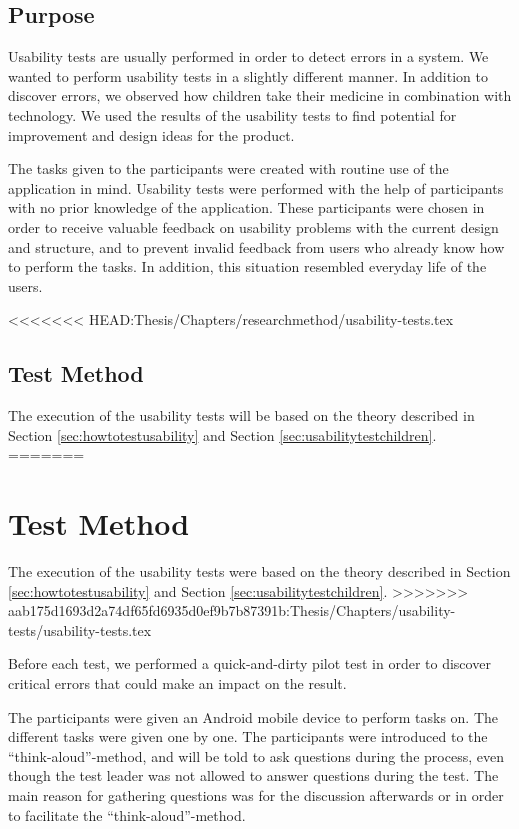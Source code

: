 
\subsection{Purpose}
\label{sec:usabilitypurpose}
Usability tests are usually performed in order to detect errors in a system. We wanted to perform usability tests in a slightly different manner. In addition to discover errors, we observed how children take their medicine in combination with technology. We used the results of the usability tests to find potential for improvement and design ideas for  the product.
 
The tasks given to the participants were created with routine use of the application in mind. Usability tests were performed with the help of participants with no prior knowledge of the application. These participants were chosen in order to receive valuable feedback on usability problems with the current design and structure, and to prevent invalid feedback from users who already know how to perform the tasks. In addition, this situation resembled everyday life of the users.


<<<<<<< HEAD:Thesis/Chapters/researchmethod/usability-tests.tex
\subsection{Test Method}
The execution of the usability tests will be based on the theory described in Section \ref{sec:howtotestusability} and Section \ref{sec:usabilitytestchildren}.
=======
\section{Test Method}
The execution of the usability tests were based on the theory described in Section \ref{sec:howtotestusability} and Section \ref{sec:usabilitytestchildren}.
>>>>>>> aab175d1693d2a74df65fd6935d0ef9b7b87391b:Thesis/Chapters/usability-tests/usability-tests.tex

Before each test, we performed a quick-and-dirty pilot test in order to discover critical errors that could make an impact on the result.

The participants were given an Android mobile device to perform tasks on. The different tasks were given one by one. The participants were introduced to the ``think-aloud''-method, and will be told to ask questions during the process, even though the test leader was not allowed to answer questions during the test. The main reason for gathering questions was for the discussion afterwards or in order to facilitate the ``think-aloud''-method. 

